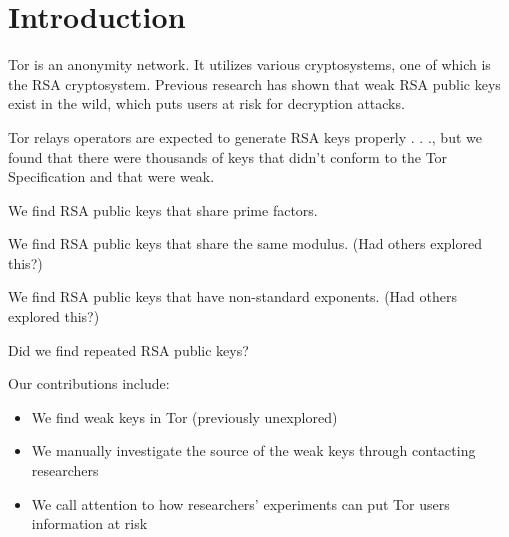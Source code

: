 \section{Introduction}
Tor is an anonymity network.  It utilizes various cryptosystems, 
one of which is the RSA cryptosystem.  Previous research has 
shown that weak RSA public keys exist in the wild, which puts users at 
risk for decryption attacks.  

Tor relays operators are expected to generate RSA keys properly . . ., but 
we found that there were thousands of keys that didn't conform to the Tor 
Specification and that were weak.

We find RSA public keys that share prime factors.

We find RSA public keys that share the same modulus.  (Had others explored this?)

We find RSA public keys that have non-standard exponents.  (Had others explored this?)

Did we find repeated RSA public keys?

Our contributions include:
\begin{itemize}
  \item We find weak keys in Tor (previously unexplored)
  \item We manually investigate the source of the weak keys 
    through contacting researchers
  \item We call attention to how researchers' experiments can put Tor users
    information at risk
\end{itemize}
